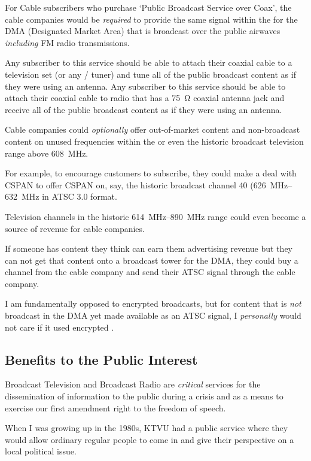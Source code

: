 For Cable subscribers who purchase `Public Broadcast Service over Coax', the cable companies
would be \emph{required} to provide the same signal within the \atscrange{} for the DMA (Designated
Market Area) that is broadcast over the public airwaves \emph{including} FM radio transmissions.

Any subscriber to this service should be able to attach their coaxial cable to a television set (or
any / tuner) and tune all of the public broadcast content as if they were using
an antenna. Any subscriber to this service should be able to attach their coaxial cable to radio
that has a \qty{75}{\ohm} coaxial antenna jack and receive all of the public broadcast content as if
they were using an antenna.

Cable companies could \emph{optionally} offer out-of-market content and non-broadcast content on
unused frequencies within the \atscrange{} or even the historic broadcast television range above
\qty{608}{\mega\hertz}.

For example, to encourage customers to subscribe, they could make a deal with CSPAN to offer
CSPAN on, say, the historic broadcast channel 40 (\qtyrange{626}{632}{\mega\hertz} in ATSC 3.0
format.

Television channels in the historic \qtyrange{614}{890}{\mega\hertz} range could even become a
source of revenue for cable companies.

If someone has content they think can earn them advertising revenue but they can not get that
content onto a broadcast tower for the DMA, they could buy a channel from the cable company and
send their ATSC signal through the cable company.

I am fundamentally opposed to encrypted broadcasts, but for content that is \emph{not} broadcast
in the DMA yet made available as an ATSC signal, I \emph{personally} would not care if it used
encrypted .

\subsection{Benefits to the Public Interest}

Broadcast Television and Broadcast Radio are \emph{critical} services for the dissemination of
information to the public during a crisis and as a means to exercise our first amendment right to
the freedom of speech.

When I was growing up in the 1980s, KTVU had a public service where they would allow ordinary
regular people to come in and give their perspective on a local political issue.

